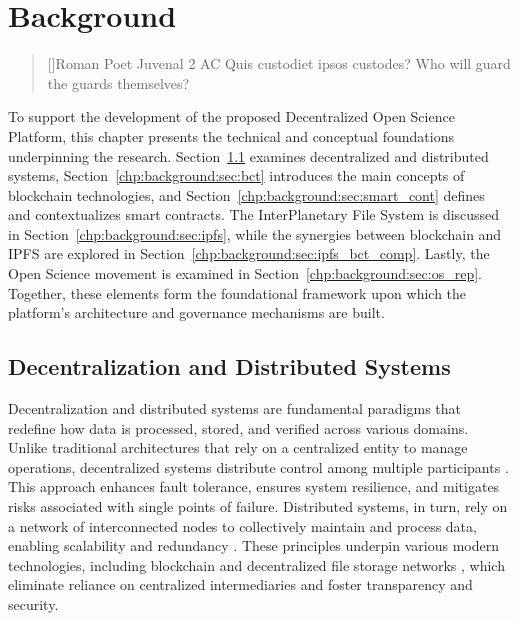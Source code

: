 \documentclass[final]{rc-book-2.14}
\begin{document}
\chapter{Background}
\label{chp:background}

\begin{quotation}[]{Roman Poet Juvenal  2 AC}
    Quis custodiet ipsos custodes?  Who will guard the guards themselves?
\end{quotation}

\drop To support the development of the proposed Decentralized Open Science Platform, this chapter presents the technical and conceptual foundations underpinning the research. 
Section~\ref{chp:background:sec:dec_dist} examines decentralized and distributed systems, Section~\ref{chp:background:sec:bct} introduces the main concepts of blockchain technologies, and Section~\ref{chp:background:sec:smart_cont} defines and contextualizes smart contracts. The InterPlanetary File System is discussed in Section~\ref{chp:background:sec:ipfs}, while the synergies between blockchain and IPFS are explored in Section~\ref{chp:background:sec:ipfs_bct_comp}. Lastly, the Open Science movement is examined in Section~\ref{chp:background:sec:os_rep}. Together, these elements form the foundational framework upon which the platform’s architecture and governance mechanisms are built.


\newpage

\section{Decentralization and Distributed Systems}
\label{chp:background:sec:dec_dist}

Decentralization and distributed systems are fundamental paradigms that redefine how data is processed, stored, and verified across various domains. Unlike traditional architectures that rely on a centralized entity to manage operations, decentralized systems distribute control among multiple participants \cite{coulouris2011distributed}. This approach enhances fault tolerance, ensures system resilience, and mitigates risks associated with single points of failure. Distributed systems, in turn, rely on a network of interconnected nodes to collectively maintain and process data, enabling scalability and redundancy   \cite{lamport_1978, coulouris2011distributed}. These principles underpin various modern technologies, including blockchain \cite{nakamoto2008bitcoin} and decentralized file storage networks \cite{benet2014ipfs}, which eliminate reliance on centralized intermediaries and foster transparency and security.
\end{document}
